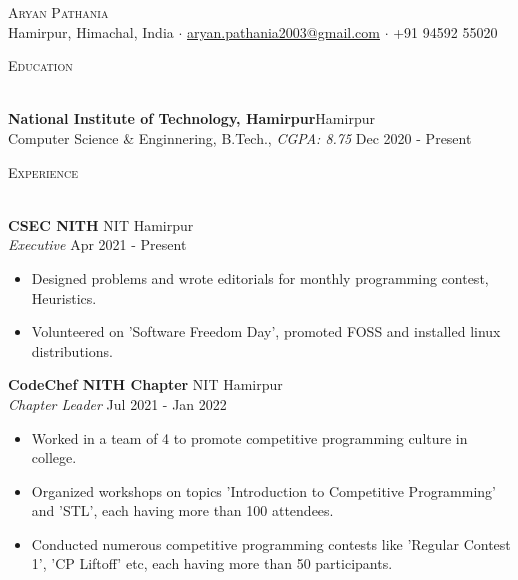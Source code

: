 \documentclass[a4paper]{article}
\newcommand{\lineunder} {
    \vspace*{-8pt} \\
    \hspace*{-18pt} \hrulefill \\
}
\newcommand{\header} [1] {
    {\hspace*{-18pt}\vspace*{6pt} \textsc{#1}}
    \vspace*{-6pt} \lineunder
}
\begin{document}
\vspace*{-40pt}



\vspace*{-10pt}
\begin{center}
	{\Huge \scshape {Aryan Pathania}}\\
	Hamirpur, Himachal, India $\cdot$ \href{mailto: aryan.pathania2003@gmail.com}{aryan.pathania2003@gmail.com} $\cdot$ +91 94592 55020\\
\end{center}



\header{Education}
\vspace{1mm}

\textbf{National Institute of Technology, Hamirpur}\hfill Hamirpur\\
Computer Science \& Enginnering, B.Tech., \textit{CGPA: 8.75} \hfill Dec 2020 - Present\\
\vspace{2mm}



\header{Experience}
\vspace{1mm}

\textbf{CSEC NITH} \hfill NIT Hamirpur\\
\textit{Executive} \hfill Apr 2021 - Present\\
\vspace{-2mm}
\begin{itemize} \itemsep -2pt
	\item Designed problems and wrote editorials for monthly programming contest, Heuristics.
	\item Volunteered on 'Software Freedom Day', promoted FOSS and installed linux distributions.
\end{itemize}

\vspace{-1mm}
\textbf{CodeChef NITH Chapter} \hfill NIT Hamirpur\\
\textit{Chapter Leader} \hfill Jul 2021 - Jan 2022\\
\vspace{-2mm}
\begin{itemize} \itemsep -2pt
    \item Worked in a team of 4 to promote competitive programming culture in college.
	\item Organized workshops on topics 'Introduction to Competitive Programming' and 'STL', each having more than 100 attendees.
	\item Conducted numerous competitive programming contests like 'Regular Contest 1', 'CP Liftoff' etc, each having more than 50 participants.
\end{itemize}
\end{document}
